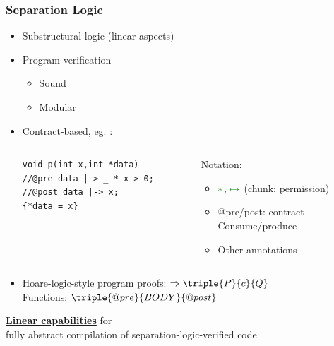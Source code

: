 \documentclass{beamer}
\begin{document}
\begin{frame}[fragile]
\frametitle{Separation Logic} 
\begin{itemize}
\item Substructural logic (linear aspects)
\item Program verification
\begin{itemize}
\item Sound %
\item Modular %
\end{itemize}
\item Contract-based, eg. :\\
\begin{columns}%
\begin{column}{0.55\textwidth}
\begin{lstlisting}[style=CStylenoNum, captionpos = t, xleftmargin = 4em]
void p(int x,int *data)
//@pre data |-> _ * x > 0;
//@post data |-> x;
{*data = x}
\end{lstlisting}
\end{column}
\begin{column}{0.45\textwidth}
Notation:
\begin{itemize}
\item $\textcolor{mGreen}{\ast}$, $\textcolor{mGreen}{\mapsto}$ (chunk: permission)
\item @pre/post: contract\\
	\quad Consume/produce
\item Other annotations
\end{itemize}
\end{column}
\end{columns}
\vspace{1em}
\item Hoare-logic-style program proofs: $\Rightarrow \triple{P}{c}{Q}$\\
	\quad Functions: $\triple{@pre}{BODY}{@post}$
\end{itemize}
\end{frame}

\begin{frame}[plain,c]

\begin{center}
\Huge \underline{\textbf{Linear capabilities}} for\\  fully abstract
compilation of separation-logic-verified code
\end{center}

\end{frame}
\end{document}
